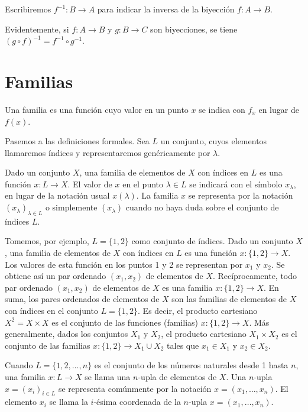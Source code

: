 \documentclass[12pt,oneside]{book}
\begin{document}
Escribiremos \(f^{-1}: B \to A\) para indicar la inversa de la biyección \(f: A \to B\).

Evidentemente, si \(f: A \to B\) y \(g: B \to C\) son biyecciones, se tiene \((g \circ f)^{-1} = f^{-1} \circ g^{-1}\).

\section{Familias}

Una familia es una función cuyo valor en un punto \(x\) se indica con \(f_x\) en lugar de \(f(x)\).

Pasemos a las definiciones formales.
Sea \(L\) un conjunto, cuyos elementos llamaremos índices y representaremos genéricamente por \(\lambda\).

Dado un conjunto \(X\), una familia de elementos de \(X\) con índices en \(L\) es una función \(x: L \to X\). El valor de \(x\) en el punto \(\lambda \in L\) se indicará con el símbolo \(x_\lambda\), en lugar de la notación usual \(x(\lambda)\). La familia \(x\) se representa por la notación \((x_\lambda)_{\lambda \in L}\) o simplemente \((x_\lambda)\) cuando no haya duda sobre el conjunto de índices \(L\).

Tomemos, por ejemplo, \(L = \{1, 2\}\) como conjunto de índices. Dado un conjunto \(X\), una familia de elementos de \(X\) con índices en \(L\) es una función \(x: \{1, 2\} \to X\). Los valores de esta función en los puntos 1 y 2 se representan por \(x_1\) y \(x_2\). Se obtiene así un par ordenado \((x_1, x_2)\) de elementos de \(X\). Recíprocamente, todo par ordenado \((x_1, x_2)\) de elementos de \(X\) es una familia \(x: \{1, 2\} \to X\). En suma, los pares ordenados de elementos de \(X\) son las familias de elementos de \(X\) con índices en el conjunto \(L = \{1, 2\}\). Es decir, el producto cartesiano \(X^2 = X \times X\) es el conjunto de las funciones (familias) \(x: \{1, 2\} \to X\). Más generalmente, dados los conjuntos \(X_1\) y \(X_2\), el producto cartesiano \(X_1 \times X_2\) es el conjunto de las familias \(x: \{1, 2\} \to X_1 \cup X_2\) tales que \(x_1 \in X_1\) y \(x_2 \in X_2\).

Cuando \(L = \{1, 2, \dots, n\}\) es el conjunto de los números naturales desde 1 hasta \(n\), una familia \(x: L \to X\) se llama una \(n\)-upla de elementos de \(X\). Una \(n\)-upla \(x = (x_i)_{i \in L}\) se representa comúnmente por la notación \(x = (x_1, \dots, x_n)\). El elemento \(x_i\) se llama la \(i\)-ésima coordenada de la \(n\)-upla \(x = (x_1, \dots, x_n)\).
\end{document}
